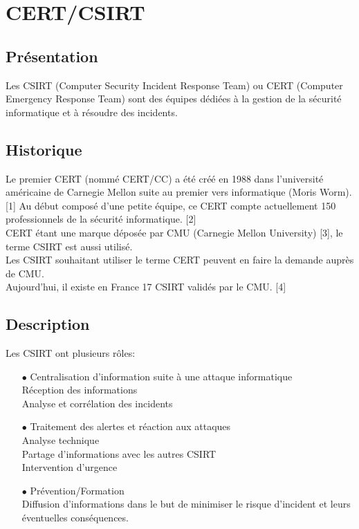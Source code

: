 \section{CERT/CSIRT}
\thispagestyle{plain}
\subsection{Présentation}
Les CSIRT (Computer Security Incident Response Team) ou CERT (Computer Emergency Response Team) sont des équipes dédiées à la gestion de la sécurité informatique et à résoudre des incidents.

\subsection{Historique}
Le premier CERT (nommé CERT/CC)  a été créé en 1988 dans l’université américaine de Carnegie Mellon suite au premier vers informatique (Moris Worm). [1]
Au début composé d’une petite équipe, ce CERT compte actuellement 150 professionnels de la sécurité informatique. [2]\\
CERT étant une marque déposée par CMU (Carnegie Mellon University) [3], le terme CSIRT est aussi utilisé.\\
Les CSIRT souhaitant utiliser le terme CERT peuvent en faire la demande auprès de CMU.\\
Aujourd’hui, il existe en France 17 CSIRT validés par le CMU. [4]\\

\subsection{Description}
Les CSIRT ont plusieurs rôles:
\begin{itemize}
\item [$\bullet$] Centralisation d’information suite à une attaque informatique\\
\subitem [$\bullet$] Réception des informations\\
\subitem [$\bullet$] Analyse et corrélation des incidents\\
\item [$\bullet$] Traitement des alertes et réaction aux attaques\\
\subitem [$\bullet$] Analyse technique\\
\subitem [$\bullet$] Partage d’informations avec les autres CSIRT\\
\subitem [$\bullet$] Intervention d’urgence\\
\item [$\bullet$] Prévention/Formation\\
\subitem [$\bullet$] Diffusion d’informations dans le but de minimiser le risque d’incident et leurs éventuelles conséquences.\\
\end{itemize}
